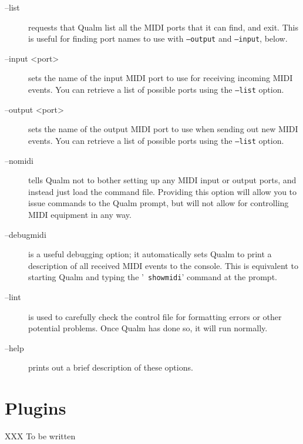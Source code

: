 \documentclass{article}
\newcommand{\q}{{\textsf{Qualm}}\xspace}
\begin{document}
\begin{description}
\item[--list] requests that \q list all the MIDI ports that it can
  find, and exit.  This is useful for finding port names to use with
  {\tt --output} and {\tt --input}, below.

\item[--input <port>] sets the name of the input MIDI port to
  use for receiving incoming MIDI events.  You can retrieve a list of
  possible ports using the {\tt --list} option.

\item[--output <port>] sets the name of the output MIDI port to
  use when sending out new MIDI events.  You can retrieve a list of
  possible ports using the {\tt --list} option.

\item[--nomidi] tells \q not to bother setting up any MIDI input or
  output ports, and instead just load the command file.  Providing
  this option will allow you to issue commands to the \q prompt, but
  will not allow for controlling MIDI equipment in any way.

\item[--debugmidi] is a useful debugging option; it automatically sets
  \q to print a description of all received MIDI events to the
  console.  This is equivalent to starting \q and typing the '{\tt
  showmidi}' command at the prompt.

\item[--lint] is used to carefully check the control file for
  formatting errors or other potential problems.  Once \q has done so,
  it will run normally.

\item[--help] prints out a brief description of these options.

\end{description}

\begin{latexonly}
\newpage
\end{latexonly}
\section{Plugins}
\label{sec:plugins}
XXX To be written


\newpage
\printindex
\end{document}
